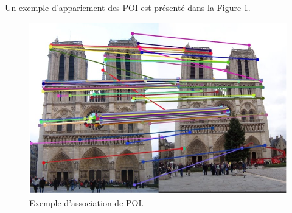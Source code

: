 \documentclass[11pt]{article}
\begin{document}
      Un exemple d'appariement des POI est présenté dans la Figure \ref{fig:Appariement}. 

      \begin{figure}[hbt]  
        \includegraphics[width=\textwidth]{AssociationPOI.png}    
        \caption{Exemple d'association de POI.}
        \label{fig:Appariement}
      \end{figure}   
    
    \pagebreak
    \printnoidxglossary[type=acronym, nonumberlist]
    \printacronyms
 
\end{document}
